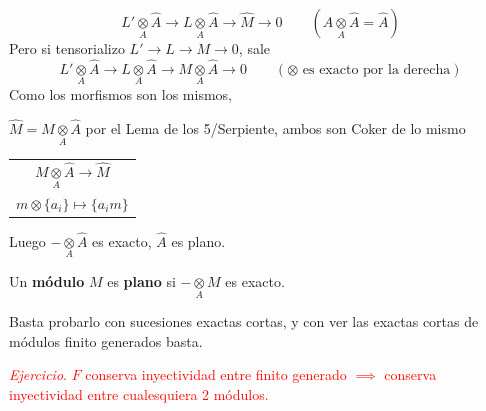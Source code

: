 \begin{cor}[Propiedades]
\begin{enumerate}
\begin{dem}
            \[ L' \underset{A}{\otimes} \widehat{A} \longrightarrow L \underset{A}{\otimes} \widehat{A} \longrightarrow \widehat{M} \longrightarrow 0 \qquad (A \underset{A}{\otimes} \widehat{A} = \widehat{A}) \]
            Pero si tensorializo $L' \to L \to M \to 0$, sale
            \[ L' \underset{A}{\otimes} \widehat{A} \longrightarrow L \underset{A}{\otimes} \widehat{A} \longrightarrow M \underset{A}{\otimes} \widehat{A} \longrightarrow 0 \qquad (\otimes \text{ es exacto por la derecha}) \]
            Como los morfismos son los mismos,
            \begin{center}
            \end{center}            
            \noindent $\widehat{M} = M \underset{A}{\otimes} \widehat{A}$ por el Lema de los 5/Serpiente, ambos son Coker de lo mismo
            \begin{center}
            \begin{tabular}{c}
            $M \underset{A}{\otimes} \widehat{A} \longrightarrow \widehat{M}$ \\
            $m \otimes \{a_i\} \longmapsto \{a_i m\}$
            \end{tabular}
            \end{center}
        \end{dem}
    \end{enumerate}
\end{cor}

Luego $- \underset{A}{\otimes} \widehat{A}$ es exacto, $\widehat{A}$ es plano.
\begin{defi}
    Un \textbf{módulo} $M$ es \textbf{plano} si $- \underset{A}{\otimes} M$ es exacto.
\end{defi} Basta probarlo con sucesiones exactas cortas, y con ver las exactas cortas de m\'odulos finito generados basta. 

\noindent \textcolor{red}{\textit{Ejercicio}. $F$ conserva inyectividad entre finito generado $\implies$ conserva inyectividad entre cualesquiera 2 módulos.}

